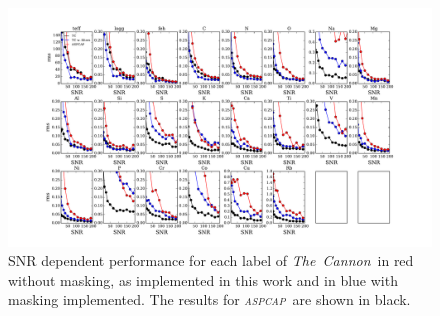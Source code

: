 \documentclass[14pt, preprint2]{aastex6}
\newcommand{\project}[1]{\textsl{#1}}
\newcommand{\tc}{\project{The~Cannon}}
\newcommand{\aspcap}{\project{\textsc{aspcap}}}
\begin{document}
\begin{figure}
\includegraphics[scale=0.45]{rms_snr_both_dr132.pdf} 
  \caption{SNR dependent performance for each label of \tc\ in red without masking, as implemented in this work and in blue with masking implemented. The results for \aspcap\  are shown in black.}
\label{fig:snr_error}
\end{figure}


\end{document}
